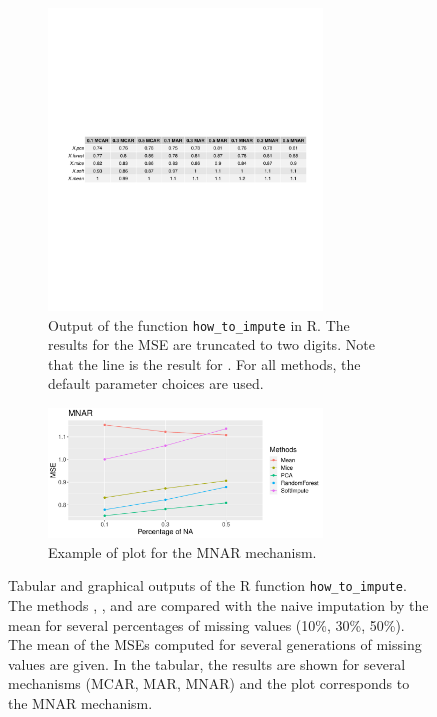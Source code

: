 \begin{figure}
\begin{subfigure}[b]{1\textwidth}
\centering
\includegraphics[width=0.8\textwidth]{figures/howtoimpute_res.pdf}
\caption{\label{fig:howtoimpute_R_table} Output of the function \texttt{how\_to\_impute} in {R}. The results for the MSE are truncated to two digits. Note that the line  is the result for . For all methods, the default parameter choices are used.}
\end{subfigure}
%
\begin{subfigure}[b]{1\textwidth}
\centering
\includegraphics[width=0.8\textwidth]{figures/HowToImpute_R_new.pdf}
\caption{\label{fig:howtoimpute_R_fig} Example of plot for the MNAR mechanism.}
\end{subfigure}
\caption{\label{fig:howtoimpute_R_main}Tabular and graphical outputs of the {R} function \texttt{how\_to\_impute}. The methods , ,  and  are compared with the naive imputation by the mean for several percentages of missing values (10\%, 30\%, 50\%). The mean of the MSEs computed for several generations of missing values are given. In the tabular, the results are shown for several mechanisms (MCAR, MAR, MNAR) and the plot corresponds to the MNAR mechanism.}
\end{figure}
